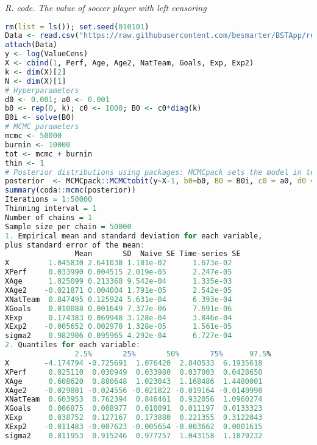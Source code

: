 \begin{tcolorbox}[enhanced,width=4.67in,center upper,
	fontupper=\large\bfseries,drop shadow southwest,sharp corners]
	\textit{R. code. The value of soccer player with left censoring}
	\begin{VF}
		\begin{lstlisting}[language=R]
rm(list = ls()); set.seed(010101)
Data <- read.csv("https://raw.githubusercontent.com/besmarter/BSTApp/refs/heads/master/DataApp/1ValueFootballPlayers.csv", sep = ",", header = TRUE, quote = "")
attach(Data)
y <- log(ValueCens) 
X <- cbind(1, Perf, Age, Age2, NatTeam, Goals, Exp, Exp2)
k <- dim(X)[2]
N <- dim(X)[1]
# Hyperparameters
d0 <- 0.001; a0 <- 0.001
b0 <- rep(0, k); c0 <- 1000; B0 <- c0*diag(k)
B0i <- solve(B0)
# MCMC parameters
mcmc <- 50000
burnin <- 10000
tot <- mcmc + burnin
thin <- 1
# Posterior distributions using packages: MCMCpack sets the model in terms of the precision matrix
posterior  <- MCMCpack::MCMCtobit(y~X-1, b0=b0, B0 = B0i, c0 = a0, d0 = d0, burnin = burnin, mcmc = mcmc, thin = thin, below = 13.82, above = Inf)
summary(coda::mcmc(posterior))
Iterations = 1:50000
Thinning interval = 1 
Number of chains = 1 
Sample size per chain = 50000 
1. Empirical mean and standard deviation for each variable,
plus standard error of the mean:
				Mean       SD  Naive SE Time-series SE
X         1.045830 2.641038 1.181e-02      1.673e-02
XPerf     0.033990 0.004515 2.019e-05      2.247e-05
XAge      1.025099 0.213368 9.542e-04      1.335e-03
XAge2    -0.021871 0.004004 1.791e-05      2.542e-05
XNatTeam  0.847495 0.125924 5.631e-04      6.393e-04
XGoals    0.010088 0.001649 7.377e-06      7.691e-06
XExp      0.174383 0.069948 3.128e-04      3.846e-04
XExp2    -0.005652 0.002970 1.328e-05      1.561e-05
sigma2    0.982906 0.095965 4.292e-04      6.727e-04
2. Quantiles for each variable:
				2.5%       25%       50%       75%      97.5%
X        -4.174794 -0.725691  1.076420  2.840533  6.1935618
XPerf     0.025110  0.030949  0.033980  0.037003  0.0428650
XAge      0.608620  0.880648  1.023043  1.168486  1.4480001
XAge2    -0.029801 -0.024556 -0.021822 -0.019164 -0.0140990
XNatTeam  0.603953  0.762394  0.846461  0.932056  1.0960274
XGoals    0.006875  0.008977  0.010091  0.011197  0.0133323
XExp      0.038752  0.127167  0.173880  0.221355  0.3122043
XExp2    -0.011483 -0.007623 -0.005654 -0.003662  0.0001615
sigma2    0.811953  0.915246  0.977257  1.043158  1.1879232
\end{lstlisting}
	\end{VF}
\end{tcolorbox} 

